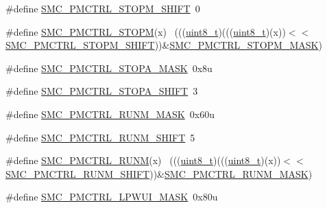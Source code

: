 \begin{DoxyCompactItemize}
\item 
\#define \hyperlink{group___s_m_c___register___masks_gaac7423086f31a8fbbfc8d18b1a876f26}{S\+M\+C\+\_\+\+P\+M\+C\+T\+R\+L\+\_\+\+S\+T\+O\+P\+M\+\_\+\+S\+H\+I\+FT}~0
\item 
\#define \hyperlink{group___s_m_c___register___masks_gac786585532e3edd7f48def55c208ef12}{S\+M\+C\+\_\+\+P\+M\+C\+T\+R\+L\+\_\+\+S\+T\+O\+PM}(x)                                        ~(((\hyperlink{_p_e___types_8h_aba7bc1797add20fe3efdf37ced1182c5}{uint8\+\_\+t})(((\hyperlink{_p_e___types_8h_aba7bc1797add20fe3efdf37ced1182c5}{uint8\+\_\+t})(x))$<$$<$\hyperlink{group___s_m_c___register___masks_gaac7423086f31a8fbbfc8d18b1a876f26}{S\+M\+C\+\_\+\+P\+M\+C\+T\+R\+L\+\_\+\+S\+T\+O\+P\+M\+\_\+\+S\+H\+I\+FT}))\&\hyperlink{group___s_m_c___register___masks_ga8df79d8a16a6d12e3b343eec59d9453c}{S\+M\+C\+\_\+\+P\+M\+C\+T\+R\+L\+\_\+\+S\+T\+O\+P\+M\+\_\+\+M\+A\+SK})
\item 
\#define \hyperlink{group___s_m_c___register___masks_gadd72ad662b62a7b51225b529fef2c77a}{S\+M\+C\+\_\+\+P\+M\+C\+T\+R\+L\+\_\+\+S\+T\+O\+P\+A\+\_\+\+M\+A\+SK}~0x8u
\item 
\#define \hyperlink{group___s_m_c___register___masks_gadfe89210f121f10b74f2fba55f059e1d}{S\+M\+C\+\_\+\+P\+M\+C\+T\+R\+L\+\_\+\+S\+T\+O\+P\+A\+\_\+\+S\+H\+I\+FT}~3
\item 
\#define \hyperlink{group___s_m_c___register___masks_ga1a456925e291d6d53f4891b25fcaf8eb}{S\+M\+C\+\_\+\+P\+M\+C\+T\+R\+L\+\_\+\+R\+U\+N\+M\+\_\+\+M\+A\+SK}~0x60u
\item 
\#define \hyperlink{group___s_m_c___register___masks_ga8f8dc472f4a4b6ad1babae518c44d55e}{S\+M\+C\+\_\+\+P\+M\+C\+T\+R\+L\+\_\+\+R\+U\+N\+M\+\_\+\+S\+H\+I\+FT}~5
\item 
\#define \hyperlink{group___s_m_c___register___masks_gaecab837484639ef513d4c54d68eacc34}{S\+M\+C\+\_\+\+P\+M\+C\+T\+R\+L\+\_\+\+R\+U\+NM}(x)                                          ~(((\hyperlink{_p_e___types_8h_aba7bc1797add20fe3efdf37ced1182c5}{uint8\+\_\+t})(((\hyperlink{_p_e___types_8h_aba7bc1797add20fe3efdf37ced1182c5}{uint8\+\_\+t})(x))$<$$<$\hyperlink{group___s_m_c___register___masks_ga8f8dc472f4a4b6ad1babae518c44d55e}{S\+M\+C\+\_\+\+P\+M\+C\+T\+R\+L\+\_\+\+R\+U\+N\+M\+\_\+\+S\+H\+I\+FT}))\&\hyperlink{group___s_m_c___register___masks_ga1a456925e291d6d53f4891b25fcaf8eb}{S\+M\+C\+\_\+\+P\+M\+C\+T\+R\+L\+\_\+\+R\+U\+N\+M\+\_\+\+M\+A\+SK})
\item 
\#define \hyperlink{group___s_m_c___register___masks_ga13fe417a536c3dc080bb978a13a6364d}{S\+M\+C\+\_\+\+P\+M\+C\+T\+R\+L\+\_\+\+L\+P\+W\+U\+I\+\_\+\+M\+A\+SK}~0x80u

\end{DoxyCompactItemize}
